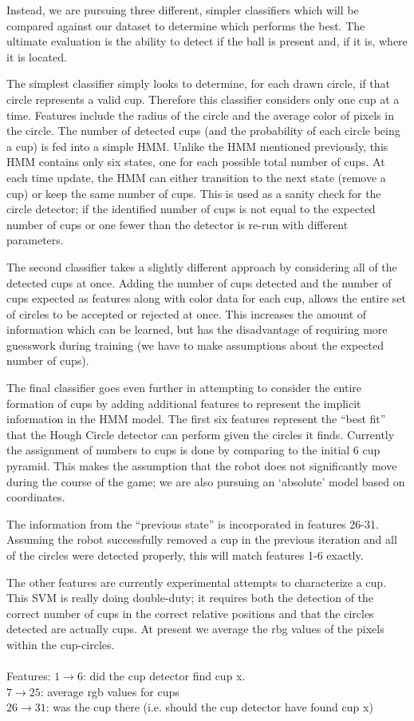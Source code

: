 \documentclass[letterpaper, 10 pt, conference]{ieeeconf}  %
\begin{document}
Instead, we are pursuing three different, simpler classifiers which will be compared against our dataset to determine which performs the best.  The ultimate evaluation is the ability to detect if the ball is present and, if it is, where it is located.

The simplest classifier simply looks to determine, for each drawn circle, if that circle represents a valid cup.  Therefore this classifier considers only one cup at a time.  Features include the radius of the circle and the average color of pixels in the circle.  The number of detected cups (and the probability of each circle being a cup) is fed into a simple HMM.  Unlike the HMM mentioned previously, this HMM contains only six states, one for each possible total number of cups.  At each time update, the HMM can either transition to the next state (remove a cup) or keep the same number of cups.  This is used as a sanity check for the circle detector; if the identified number of cups is not equal to the expected number of cups or one fewer than the detector is re-run with different parameters.

The second classifier takes a slightly different approach by considering all of the detected cups at once. Adding the number of cups detected and the number of cups expected as features along with color data for each cup, allows the entire set of circles to be accepted or rejected at once.  This increases the amount of information which can be learned, but has the disadvantage of requiring more guesswork during training (we have to make assumptions about the expected number of cups).

The final classifier goes even further in attempting to consider the entire formation of cups by adding additional features to represent the implicit information in the HMM model.  The first six features represent the “best fit” that the Hough Circle detector can perform given the circles it finds.  Currently the assignment of numbers to cups is done by comparing to the initial 6 cup pyramid.  This makes the assumption that the robot does not significantly move during the course of the game; we are also pursuing an ‘absolute’ model based on coordinates.
    
The information from the “previous state” is incorporated in features 26-31.  Assuming the robot successfully removed a cup in the previous iteration and all of the circles were detected properly, this will match features 1-6 exactly.

The other features are currently experimental attempts to characterize a cup.  This SVM is really doing double-duty; it requires both the detection of the correct number of cups in the correct relative positions and that the circles detected are actually cups.  At present we average the rbg values of the pixels within the cup-circles.\\\\
Features: 
$1 \rightarrow 6$: did the cup detector find cup x. \\
$7 \rightarrow 25$: average rgb values for cups\\
$26 \rightarrow 31$: was the cup there (i.e. should the cup detector have found cup x)\\
\end{document}
